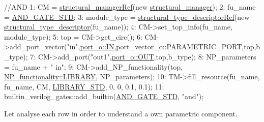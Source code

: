 \begin{DoxyCode}
    \textcolor{comment}{//AND}
 1: CM = \hyperlink{structural__manager_8hpp_ab3136f0e785d8535f8d252a7b53db5b5}{structural\_managerRef}(\textcolor{keyword}{new} \hyperlink{classstructural__manager}{structural\_manager});
 2: fu\_name = \hyperlink{technology__node_8hpp_a92082a6ad93e10690c4c96dac3496de8}{AND\_GATE\_STD};
 3: module\_type = \hyperlink{structural__objects_8hpp_a219296792577e3292783725961506c83}{structural\_type\_descriptorRef}(\textcolor{keyword}{new} 
      \hyperlink{structstructural__type__descriptor}{structural\_type\_descriptor}(fu\_name));
 4: CM->set\_top\_info(fu\_name, module\_type);
 5: top = CM->get\_circ();
 6: CM->add\_port\_vector(\textcolor{stringliteral}{"in"},\hyperlink{structport__o_adb254df5665ff28b0769491cc3899fd5aa135fbd4d182c73be50d31f88e981284}{port\_o::IN},port\_vector\_o::PARAMETRIC\_PORT,top,b\_type);
 7: CM->add\_port(\textcolor{stringliteral}{"out1"},\hyperlink{structport__o_adb254df5665ff28b0769491cc3899fd5ab3bfd4c2f6c68477c8c78a747e879f18}{port\_o::OUT},top,b\_type);
 8: NP\_parameters = fu\_name + \textcolor{stringliteral}{" in"};
 9: CM->add\_NP\_functionality(top, \hyperlink{classNP__functionality_a318d6f254060bfdf145ebeb41efe772ea3b9722f936843fecd500060388fc65e6}{NP\_functionality::LIBRARY}, NP\_parameters);
10: TM->fill\_resource(fu\_name, fu\_name, CM, \hyperlink{technology__manager_8hpp_a0033bdd1d1c034f88d486516cd90f614}{LIBRARY\_STD}, 0, 0, 0.1,  0.1);
11: builtin\_verilog\_gates::add\_builtin(\hyperlink{technology__node_8hpp_a92082a6ad93e10690c4c96dac3496de8}{AND\_GATE\_STD}, \textcolor{stringliteral}{"and"});
\end{DoxyCode}
 Let analyse each row in order to understand a own parametric component.
